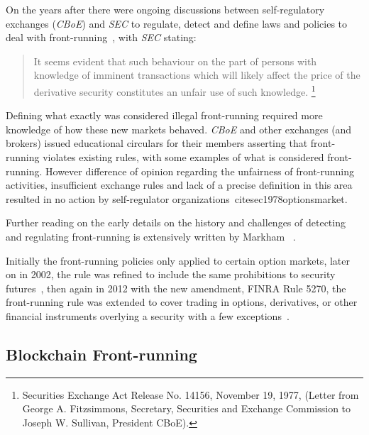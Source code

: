
On the years after there were ongoing discussions between self-regulatory exchanges (\eg \textit{CBoE}) and \textit{SEC} to regulate, detect and define laws and policies to deal with front-running~\cite{markham1988front}, with \textit{SEC} stating: 
\begin{quote}
It seems evident that such behaviour on the part of persons with knowledge of imminent transactions which will likely affect the price of the derivative security constitutes an unfair use of such knowledge. \footnote{Securities Exchange Act Release No. 14156, November 19, 1977, (Letter from George A. Fitzsimmons, Secretary, Securities and Exchange Commission to Joseph W. Sullivan, President  CBoE).}
\end{quote} 

Defining what exactly was considered illegal front-running required more knowledge of how these new markets behaved. \textit{CBoE} and other exchanges (and brokers) issued educational circulars for their members asserting that front-running violates existing rules, with some examples of what is considered front-running. However difference of opinion regarding the unfairness of front-running activities, insufficient exchange rules and lack of a precise definition in this area resulted in no action by self-regulator organizations~cite{sec1978optionsmarket}. 

Further reading on the early details on the history and challenges of detecting and regulating front-running is extensively written by Markham~\cite{markham1988front} . %

Initially the front-running policies only applied to certain option markets, later on in 2002, the rule was refined to include the same prohibitions to security futures~\cite{finra_2002},  then again in 2012 with the new amendment, FINRA Rule 5270, the front-running rule was extended to cover trading in options, derivatives, or other financial instruments overlying a security with a few exceptions~\cite{sec2012frontrunning, finra_2012}.


\subsection{Blockchain Front-running} %
\label{sec:Front Running on the Blockchains}

